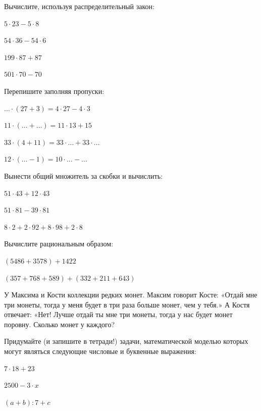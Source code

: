\begin{listofex}
	\item Вычислите, используя распределительный закон:
	\begin{enumcols}[itemcolumns=2]
		\item \( 5\cdot23-5\cdot8 \)
		\item \( 54\cdot36-54\cdot6 \)
		\item \( 199\cdot87+87 \)
		\item \( 501\cdot70-70 \)
	\end{enumcols}
	\item Перепишите заполняя пропуски:
	\begin{enumcols}[itemcolumns=2]
		\item \( {\dots}\cdot(27+3)=4\cdot27-4\cdot3 \)
		\item \( 11\cdot({\dots}+{\dots})=11\cdot13+15 \)
		\item \( 33\cdot(4+11)=33\cdot{\dots}+33\cdot{\dots} \)
		\item \( 12\cdot({\dots}-1)=10\cdot{\dots}-{\dots} \)
	\end{enumcols}
	\item Вынести общий множитель за скобки и вычислить:
	\begin{enumcols}[itemcolumns=3]
		\item \( 51\cdot43+12\cdot43 \)
		\item \( 51\cdot81-39\cdot81 \)
		\item \( 8\cdot2+2\cdot92+8\cdot98+2\cdot8 \)
	\end{enumcols}
	\item Вычислите рациональным образом:
	\begin{enumcols}[itemcolumns=2]
		\item \( (5486+3578)+1422 \)
		\item \( (357+768+589)+(332+211+643) \)
	\end{enumcols}
	\item У Максима и Кости коллекции редких монет. Максим говорит Косте: «Отдай мне три монеты, тогда у меня будет в три раза больше
	монет, чем у тебя.» А Костя отвечает: «Нет! Лучше отдай ты мне три монеты, тогда у нас будет монет поровну. Сколько монет у каждого?
	\item Придумайте (и запишите в тетради!) задачи, математической моделью которых могут
	являться следующие числовые и буквенные выражения:
	\begin{enumcols}[itemcolumns=3]
		\item \( 7\cdot18+23 \)
		\item \( 2500 - 3\cdot x \)
		\item \( (a+b):7+c \)
	\end{enumcols}
\end{listofex}
